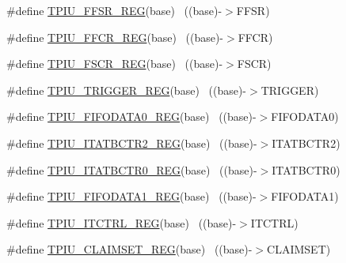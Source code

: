 \begin{DoxyCompactItemize}
\item 
\#define \hyperlink{group___t_p_i_u___register___accessor___macros_ga87fa1043a4397fabb81e4be255c0a6d2}{T\+P\+I\+U\+\_\+\+F\+F\+S\+R\+\_\+\+R\+EG}(base)                                        ~((base)-\/$>$F\+F\+SR)
\item 
\#define \hyperlink{group___t_p_i_u___register___accessor___macros_ga890150a55f047ae7b0e424fb1ab69c62}{T\+P\+I\+U\+\_\+\+F\+F\+C\+R\+\_\+\+R\+EG}(base)                                        ~((base)-\/$>$F\+F\+CR)
\item 
\#define \hyperlink{group___t_p_i_u___register___accessor___macros_ga9502e583218f28d70aed3da35b51fa9c}{T\+P\+I\+U\+\_\+\+F\+S\+C\+R\+\_\+\+R\+EG}(base)                                        ~((base)-\/$>$F\+S\+CR)
\item 
\#define \hyperlink{group___t_p_i_u___register___accessor___macros_gae0e1f67cdfd71a79d152c901cb744a34}{T\+P\+I\+U\+\_\+\+T\+R\+I\+G\+G\+E\+R\+\_\+\+R\+EG}(base)                                  ~((base)-\/$>$T\+R\+I\+G\+G\+ER)
\item 
\#define \hyperlink{group___t_p_i_u___register___accessor___macros_ga594012ee05bd16f52ef3428367d9aa09}{T\+P\+I\+U\+\_\+\+F\+I\+F\+O\+D\+A\+T\+A0\+\_\+\+R\+EG}(base)                              ~((base)-\/$>$F\+I\+F\+O\+D\+A\+T\+A0)
\item 
\#define \hyperlink{group___t_p_i_u___register___accessor___macros_ga99561f9638b22afba7974e22aa56d93d}{T\+P\+I\+U\+\_\+\+I\+T\+A\+T\+B\+C\+T\+R2\+\_\+\+R\+EG}(base)                              ~((base)-\/$>$I\+T\+A\+T\+B\+C\+T\+R2)
\item 
\#define \hyperlink{group___t_p_i_u___register___accessor___macros_gaebf01febdbeec8c142c03b5c074e1fed}{T\+P\+I\+U\+\_\+\+I\+T\+A\+T\+B\+C\+T\+R0\+\_\+\+R\+EG}(base)                              ~((base)-\/$>$I\+T\+A\+T\+B\+C\+T\+R0)
\item 
\#define \hyperlink{group___t_p_i_u___register___accessor___macros_ga94e7646ffbef879b19b84538655f8661}{T\+P\+I\+U\+\_\+\+F\+I\+F\+O\+D\+A\+T\+A1\+\_\+\+R\+EG}(base)                              ~((base)-\/$>$F\+I\+F\+O\+D\+A\+T\+A1)
\item 
\#define \hyperlink{group___t_p_i_u___register___accessor___macros_ga3fb80a5db7419d9b28f36030fa56c9f6}{T\+P\+I\+U\+\_\+\+I\+T\+C\+T\+R\+L\+\_\+\+R\+EG}(base)                                    ~((base)-\/$>$I\+T\+C\+T\+RL)
\item 
\#define \hyperlink{group___t_p_i_u___register___accessor___macros_ga36e2ff51a935b49ba3848abac32d9771}{T\+P\+I\+U\+\_\+\+C\+L\+A\+I\+M\+S\+E\+T\+\_\+\+R\+EG}(base)                                ~((base)-\/$>$C\+L\+A\+I\+M\+S\+ET)

\end{DoxyCompactItemize}

